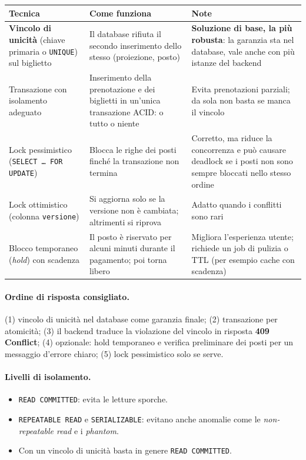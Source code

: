 \begin{center}
\small
\begin{tabularx}{\textwidth}{@{}>{\raggedright\arraybackslash}p{3.3cm}XX@{}}
\toprule
\textbf{Tecnica} & \textbf{Come funziona} & \textbf{Note} \\
\midrule
\textbf{Vincolo di unicità} (chiave primaria o \texttt{UNIQUE}) sul biglietto & Il database rifiuta il secondo inserimento dello stesso (proiezione, posto) & \textbf{Soluzione di base, la più robusta}: la garanzia sta nel database, vale anche con più istanze del backend \\
Transazione con isolamento adeguato & Inserimento della prenotazione e dei biglietti in un'unica transazione ACID: o tutto o niente & Evita prenotazioni parziali; da sola non basta se manca il vincolo \\
Lock pessimistico (\texttt{SELECT \ldots{} FOR UPDATE}) & Blocca le righe dei posti finché la transazione non termina & Corretto, ma riduce la concorrenza e può causare deadlock se i posti non sono sempre bloccati nello stesso ordine \\
Lock ottimistico (colonna \texttt{versione}) & Si aggiorna solo se la versione non è cambiata; altrimenti si riprova & Adatto quando i conflitti sono rari \\
Blocco temporaneo (\emph{hold}) con scadenza & Il posto è riservato per alcuni minuti durante il pagamento; poi torna libero & Migliora l'esperienza utente; richiede un job di pulizia o TTL (per esempio cache con scadenza) \\
\bottomrule
\end{tabularx}
\end{center}

\paragraph{Ordine di risposta consigliato.} (1) vincolo di unicità nel database come garanzia finale; (2) transazione per atomicità; (3) il backend traduce la violazione del vincolo in risposta \textbf{409 Conflict}; (4) opzionale: hold temporaneo e verifica preliminare dei posti per un messaggio d'errore chiaro; (5) lock pessimistico solo se serve.

\paragraph{Livelli di isolamento.}
\begin{itemize}
    \item \texttt{READ COMMITTED}: evita le letture sporche.
    \item \texttt{REPEATABLE READ} e \texttt{SERIALIZABLE}: evitano anche anomalie come le \emph{non-repeatable read} e i \emph{phantom}.
    \item Con un vincolo di unicità basta in genere \texttt{READ COMMITTED}.
\end{itemize}

